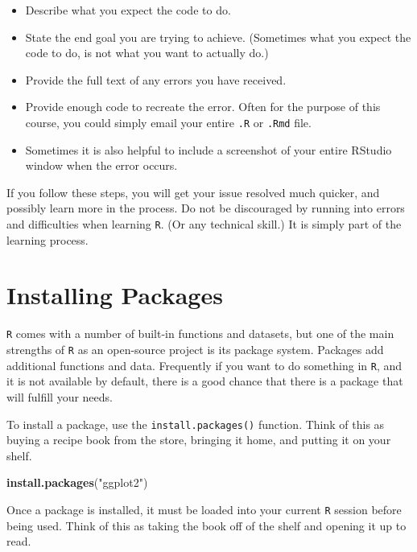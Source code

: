 \documentclass[]{book}
\newenvironment{Shaded}{\begin{snugshade}}{\end{snugshade}}
\newcommand{\KeywordTok}[1]{\textcolor[rgb]{0.13,0.29,0.53}{\textbf{#1}}}
\newcommand{\StringTok}[1]{\textcolor[rgb]{0.31,0.60,0.02}{#1}}
\newcommand{\NormalTok}[1]{#1}
\providecommand{\tightlist}{%
  \setlength{\itemsep}{0pt}\setlength{\parskip}{0pt}}
\theoremstyle{definition}
\theoremstyle{definition}
\theoremstyle{definition}
\theoremstyle{remark}
\begin{document}
\begin{itemize}
\tightlist
\item
  Describe what you expect the code to do.
\item
  State the end goal you are trying to achieve. (Sometimes what you
  expect the code to do, is not what you want to actually do.)
\item
  Provide the full text of any errors you have received.
\item
  Provide enough code to recreate the error. Often for the purpose of
  this course, you could simply email your entire \texttt{.R} or
  \texttt{.Rmd} file.
\item
  Sometimes it is also helpful to include a screenshot of your entire
  RStudio window when the error occurs.
\end{itemize}

If you follow these steps, you will get your issue resolved much
quicker, and possibly learn more in the process. Do not be discouraged
by running into errors and difficulties when learning \texttt{R}. (Or
any technical skill.) It is simply part of the learning process.

\section{Installing Packages}\label{installing-packages}

\texttt{R} comes with a number of built-in functions and datasets, but
one of the main strengths of \texttt{R} as an open-source project is its
package system. Packages add additional functions and data. Frequently
if you want to do something in \texttt{R}, and it is not available by
default, there is a good chance that there is a package that will
fulfill your needs.

To install a package, use the \texttt{install.packages()} function.
Think of this as buying a recipe book from the store, bringing it home,
and putting it on your shelf.

\begin{Shaded}
\begin{Highlighting}[]
\KeywordTok{install.packages}\NormalTok{(}\StringTok{"ggplot2"}\NormalTok{)}
\end{Highlighting}
\end{Shaded}

Once a package is installed, it must be loaded into your current
\texttt{R} session before being used. Think of this as taking the book
off of the shelf and opening it up to read.
\end{document}
